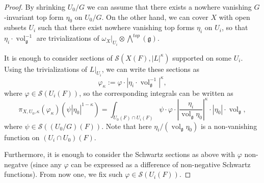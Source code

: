 \documentclass[12pt,reqno]{amsart}
\DeclareMathOperator\C{\mathbb C}
\theoremstyle{definition}
\theoremstyle{remark}
\numberwithin{equation}{section}
\newcommand{\ot}{\otimes}
\newcommand{\Om}{\Omega}
\renewcommand{\SS}{{\mathcal S}}
\newcommand{\om}{\omega}
\newcommand{\fg}{{\mathfrak g}}
\newcommand{\vol}{{\operatorname{vol}}}
\begin{document}
\begin{proof}
By shrinking $U_0/G$ we can assume that there exists a nowhere vanishing
$G$-invariant top form $\eta_0$ on $U_0/G$. 
On the other hand, we can cover $X$ with open subsets $U_i$ such that there exist nowhere vanishing top forms $\eta_i$ on $U_i$, so that $\eta_i\cdot \vol_{\fg}^{-1}$
are trivializations of $\om_X|_{U_i}\ot {\bigwedge}^{top}(\fg)$.

It is enough to consider sections of $\SS(X(F),|L|^{\kappa})$ supported on some $U_i$. Using the trivializations of $L|_{U_i}$, we can write these sections as
$$\varphi_\kappa:=\varphi\cdot |\eta_i\cdot \vol_{\fg}^{-1}|^{\kappa},$$
where $\varphi\in \SS(U_i(F))$, so
the corresponding integrals can be written as
\begin{equation}\label{Ui-integral-eq}
\pi_{X,U_0,\kappa}(\varphi_\kappa)(\psi |\eta_0|^{1-\kappa})=
\int_{U_0(F)\cap U_i(F)} \psi\cdot \varphi\cdot |\frac{\eta_i}{\vol_{\fg}\eta_0}|^{\kappa}\cdot |\eta_0|\cdot \vol_{\fg},
\end{equation}
where $\psi\in \SS((U_0/G)(F))$. Note that here $\eta_i/(\vol_{\fg}\eta_0)$ is a non-vanishing function on $(U_i\cap U_0)(F)$.

Furthermore, it is enough to consider the Schwartz sections as above with $\varphi$
non-negatve (since any $\varphi$ can be expressed as a difference of non-negative Schwartz functions).
From now one, we fix such $\varphi\in\SS(U_i(F))$.


\end{proof}
\end{document}
